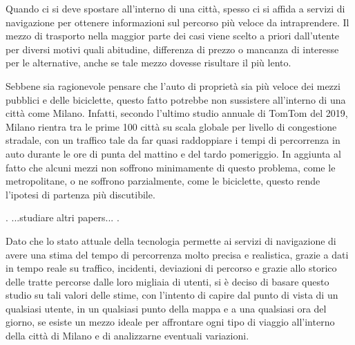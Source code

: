 Quando ci si deve spostare all'interno di una città, spesso ci si affida a servizi di navigazione per ottenere informazioni sul percorso più veloce da intraprendere.
Il mezzo di trasporto nella maggior parte dei casi viene scelto a priori dall'utente per diversi motivi quali abitudine, differenza di prezzo o mancanza di interesse per le alternative, anche se tale mezzo dovesse risultare il più lento.

Sebbene sia ragionevole pensare che l'auto di proprietà sia più veloce dei mezzi pubblici e delle biciclette, questo fatto potrebbe non sussistere all'interno di una città come Milano. Infatti, secondo l'ultimo studio annuale di TomTom del 2019\cite{tomtomindexmilan}, Milano rientra tra le prime 100 città su scala globale per livello di congestione stradale, con un traffico tale da far quasi raddoppiare i tempi di percorrenza in auto durante le ore di punta del mattino e del tardo pomeriggio. In aggiunta al fatto che alcuni mezzi non soffrono minimamente di questo problema, come le metropolitane, o ne soffrono parzialmente, come le biciclette, questo rende l'ipotesi di partenza più discutibile.

.\newline
...studiare altri papers... \newline
.

Dato che lo stato attuale della tecnologia permette ai servizi di navigazione di avere una stima del tempo di percorrenza molto precisa e realistica, grazie a dati in tempo reale su traffico, incidenti, deviazioni di percorso e grazie allo storico delle tratte percorse dalle loro migliaia di utenti, si è deciso di basare questo studio su tali valori delle stime, con l'intento di capire dal punto di vista di un qualsiasi utente, in un qualsiasi punto della mappa e a una qualsiasi ora del giorno, se esiste un mezzo ideale per affrontare ogni tipo di viaggio all'interno della città di Milano e di analizzarne eventuali variazioni.
